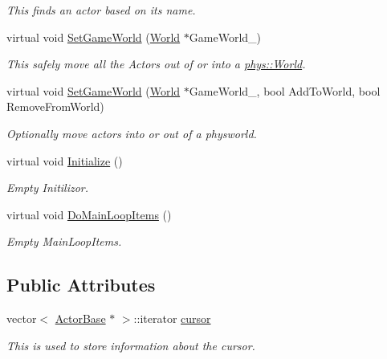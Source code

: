 \begin{DoxyCompactItemize}
\begin{DoxyCompactList}\small\item\em This finds an actor based on its name. \item\end{DoxyCompactList}\item 
virtual void \hyperlink{classphys_1_1ActorContainerVector_ab4c1394254057465f7a2f89b87dc49aa}{SetGameWorld} (\hyperlink{classphys_1_1World}{World} $\ast$GameWorld\_\-)
\begin{DoxyCompactList}\small\item\em This safely move all the Actors out of or into a \hyperlink{classphys_1_1World}{phys::World}. \item\end{DoxyCompactList}\item 
virtual void \hyperlink{classphys_1_1ActorContainerVector_a721d0cde6fc4f1e8d3b33867cd5c82df}{SetGameWorld} (\hyperlink{classphys_1_1World}{World} $\ast$GameWorld\_\-, bool AddToWorld, bool RemoveFromWorld)
\begin{DoxyCompactList}\small\item\em Optionally move actors into or out of a physworld. \item\end{DoxyCompactList}\item 
virtual void \hyperlink{classphys_1_1ActorContainerVector_adcebf4329a587669f74e1eacc1e6912c}{Initialize} ()
\begin{DoxyCompactList}\small\item\em Empty Initilizor. \item\end{DoxyCompactList}\item 
virtual void \hyperlink{classphys_1_1ActorContainerVector_a883e59ac1674421bac143088a6cf07c8}{DoMainLoopItems} ()
\begin{DoxyCompactList}\small\item\em Empty MainLoopItems. \item\end{DoxyCompactList}\end{DoxyCompactItemize}
\subsection*{Public Attributes}
\begin{DoxyCompactItemize}
\item 
vector$<$ \hyperlink{classphys_1_1ActorBase}{ActorBase} $\ast$ $>$::iterator \hyperlink{classphys_1_1ActorContainerVector_a08bdad9b15e265b5d44470f21766b6ed}{cursor}
\begin{DoxyCompactList}\small\item\em This is used to store information about the cursor. \item\end{DoxyCompactList}\end{DoxyCompactItemize}


